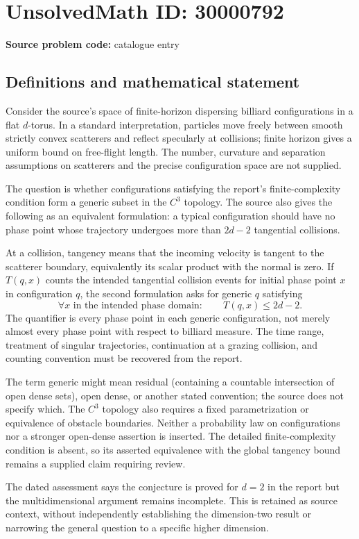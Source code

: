 \documentclass[11pt]{article}
\begin{document}
\section*{UnsolvedMath ID: 30000792}
\textbf{Source problem code:} catalogue entry
\subsection{Definitions and mathematical statement}
Consider the source's space of finite-horizon dispersing billiard configurations in a flat $d$-torus. In a standard interpretation, particles move freely between smooth strictly convex scatterers and reflect specularly at collisions; finite horizon gives a uniform bound on free-flight length. The number, curvature and separation assumptions on scatterers and the precise configuration space are not supplied.

The question is whether configurations satisfying the report's finite-complexity condition form a generic subset in the $C^3$ topology. The source also gives the following as an equivalent formulation: a typical configuration should have no phase point whose trajectory undergoes more than $2d-2$ tangential collisions.

At a collision, tangency means that the incoming velocity is tangent to the scatterer boundary, equivalently its scalar product with the normal is zero. If $T(q,x)$ counts the intended tangential collision events for initial phase point $x$ in configuration $q$, the second formulation asks for generic $q$ satisfying
\[
 \forall x\text{ in the intended phase domain}:\qquad T(q,x)\le2d-2.
\]
The quantifier is every phase point in each generic configuration, not merely almost every phase point with respect to billiard measure. The time range, treatment of singular trajectories, continuation at a grazing collision, and counting convention must be recovered from the report.

The term generic might mean residual (containing a countable intersection of open dense sets), open dense, or another stated convention; the source does not specify which. The $C^3$ topology also requires a fixed parametrization or equivalence of obstacle boundaries. Neither a probability law on configurations nor a stronger open-dense assertion is inserted. The detailed finite-complexity condition is absent, so its asserted equivalence with the global tangency bound remains a supplied claim requiring review.

The dated assessment says the conjecture is proved for $d=2$ in the report but the multidimensional argument remains incomplete. This is retained as source context, without independently establishing the dimension-two result or narrowing the general question to a specific higher dimension.
\end{document}
